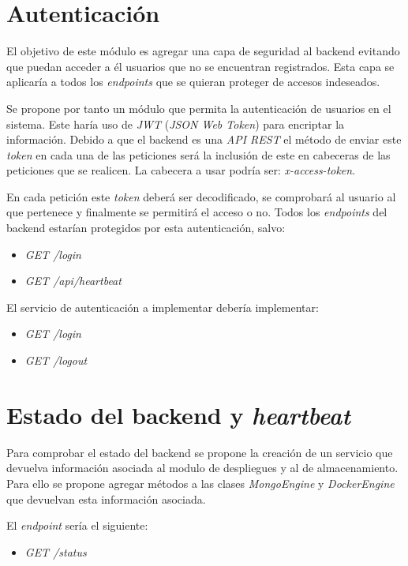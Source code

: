 \section{Autenticación}
\label{sec:authcap6}

El objetivo de este módulo es agregar una capa de seguridad al backend evitando que puedan acceder a él usuarios que no se encuentran registrados. Esta capa se aplicaría a todos los \textit{endpoints} que se quieran proteger de accesos indeseados.

Se propone por tanto un módulo que permita la autenticación de usuarios en el sistema. Este haría uso de \textit{JWT} (\textit{JSON Web Token}) para encriptar la información. Debido a que el backend es una \textit{API REST} el método de enviar este \textit{token} en cada una de las peticiones será la inclusión de este en cabeceras de las peticiones que se realicen. La cabecera a usar podría ser: \textit{x-access-token}.

En cada petición este \textit{token} deberá ser decodificado, se comprobará al usuario al que pertenece y finalmente se permitirá el acceso o no. Todos los \textit{endpoints} del backend estarían protegidos por esta autenticación, salvo:
\begin{itemize}
	\item \textit{GET /login}
	\item \textit{GET /api/heartbeat}
\end{itemize}


\bigskip
El servicio de autenticación a implementar debería implementar:
\begin{itemize}
	\item \textit{GET /login}
	\item \textit{GET /logout}
\end{itemize}



\section{Estado del backend y \textit{heartbeat}}
\label{sec:statuscap6}


Para comprobar el estado del backend se propone la creación de un servicio que devuelva información asociada al modulo de despliegues y al de almacenamiento. Para ello se propone agregar métodos a las clases \textit{MongoEngine} y \textit{DockerEngine} que devuelvan esta información asociada.

\bigskip
El \textit{endpoint} sería el siguiente:
\begin{itemize}
	\item \textit{GET /status}
\end{itemize}

